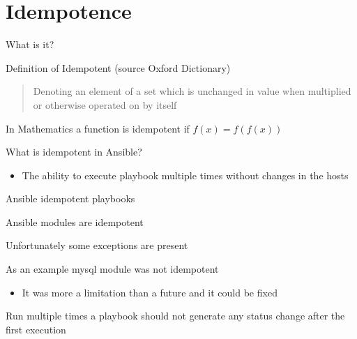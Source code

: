 \documentclass[12pt, xcolor={dvipsnames}]{beamer}
\newenvironment{wideitemize}{\itemize\addtolength{\itemsep}{12pt}}{\enditemize}
\begin{document}
\section{Idempotence}

\begin{frame}[t]{What is it?}
  \begin{block}{Definition of Idempotent (source Oxford Dictionary)}
    \begin{quote}
      Denoting an element of a set which is unchanged in value when multiplied or otherwise operated on by itself
    \end{quote}
  \end{block}

  \begin{wideitemize}
    \item In Mathematics a function is idempotent if $f(x)=f(f(x))$
    \item What is idempotent in Ansible?
    \begin{itemize}
      \item The ability to execute playbook multiple times without changes in the hosts
    \end{itemize}
  \end{wideitemize}
\end{frame}

\begin{frame}[t]{Ansible idempotent playbooks}
  \begin{wideitemize}
    \item Ansible modules are idempotent
    \begin{wideitemize}
      \item Unfortunately some exceptions are present
      \item As an example mysql module was not idempotent
      \begin{itemize}
        \item It was more a limitation than a future and it could be fixed
      \end{itemize}
    \end{wideitemize}
    \item Run multiple times a playbook should not generate any status change after the first execution
  \end{wideitemize}
\end{frame}
\end{document}
